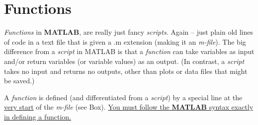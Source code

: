 \documentclass{tufte-book} %
\begin{document}
\newpage


\section{Functions}

\textit{Functions} in \textbf{MATLAB}, are really just fancy \textit{scripts}. Again -- just plain old lines of code in a text file that is given a \textsf{.m} extension (making it an \textit{m-file}). The big difference from a \textit{script} in MATLAB is that a \textit{function} can take variables as input and/or return variables (or variable values) as an output. (In contrast, a \textit{script} takes no input and returns no outputs, other than plots or data files that might be saved.) 

A \textit{function} is defined (and differentiated from a \textit{script}) by a special line at the \uline{very start} of the \textit{m-file} (see Box). \uline{You must follow the \textbf{MATLAB} syntax exactly in defining a function.}
\end{document}
